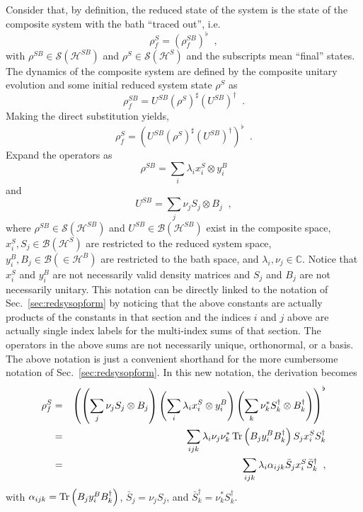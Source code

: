 Consider that, by definition, the reduced state of the system is the state of the composite system with the bath ``traced out'', i.e.\
$$
\rho^S_f = \left(\rho^{SB}_f\right)^\flat\;\;,
$$
with $\rho^{SB}\in\mathcal{S}(\mathcal{H}^{SB})$ and $\rho^S\in\mathcal{S}(\mathcal{H}^S)$ and the subscripts mean ``final'' states.  The dynamics of the composite system are defined by the composite unitary evolution and some initial reduced system state $\rho^S$ as
$$
\rho^{SB}_f = U^{SB} \left(\rho^{S}\right)^\sharp \left(U^{SB}\right)^\dagger\;\;.
$$
Making the direct substitution yields,
\begin{equation}
\rho^{S}_f = \left(U^{SB} \left(\rho^{S}\right)^\sharp \left(U^{SB}\right)^\dagger\right)^\flat\;\;.
\end{equation}
Expand the operators as
\begin{equation}
\rho^{SB} = \sum_i \lambda_i x_i^S \otimes y_i^B
\end{equation}
and
\begin{equation}
U^{SB} = \sum_j \nu_j S_j \otimes B_j\;\;,
\end{equation}
where $\rho^{SB}\in\mathcal{S}(\mathcal{H}^{SB})$ and $U^{SB}\in\mathcal{B}(\mathcal{H}^{SB})$ exist in the composite space, $x^S_i,S_j\in\mathcal{B}(\mathcal{H}^S)$ are restricted to the reduced system space, $y^B_i,B_j\in\mathcal{B}(\in\mathcal{H}^B)$ are restricted to the bath space, and $\lambda_i,\nu_j\in\mathbb{C}$.  Notice that $x_i^S$ and $y_i^B$ are not necessarily valid density matrices and $S_j$ and $B_j$ are not necessarily unitary.  This notation can be directly linked to the notation of Sec.\ \ref{sec:redsysopform} by noticing that the above constants are actually products of the constants in that section and the indices $i$ and $j$ above are actually single index labels for the multi-index sums of that section.  The operators in the above sums are not necessarily unique, orthonormal, or a basis.  The above notation is just a convenient shorthand for the more cumbersome notation of Sec.\ \ref{sec:redsysopform}.  In this new notation, the derivation becomes
\begin{eqnarray}
\label{eqn:notationref}
\rho^S_f &=& \left( \left( \sum_j \nu_j S_j\otimes B_j\right)\left( \sum_i \lambda_i x_i^S\otimes y_i^B\right)\left(\sum_k \nu_k^* S_k^\dagger \otimes B_k^\dagger\right)\right)^\flat\\
&=& \sum_{ijk} \lambda_i \nu_j \nu_k^* \operatorname{Tr}\left(B_j y_i^B B_k^\dagger\right) S_j x_i^S S_k^\dagger\\
&=& \sum_{ijk} \lambda_i \alpha_{ijk} \bar{S}_j x_i^S \bar{S}_k^\dagger\;\;,
\end{eqnarray}
with $\alpha_{ijk} = \operatorname{Tr}\left(B_j y_i^B B_k^\dagger\right)$, $\bar{S}_j = \nu_j S_j$, and $\bar{S}_k^\dagger = \nu_k^* S_k^\dagger$.  

